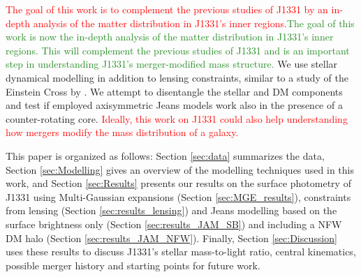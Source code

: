 \documentclass[useAMS,usenatbib]{mnras}
\newcommand{\NEW}[1]{\textcolor{ForestGreen}{#1}}
\newcommand{\OLD}[1]{\textcolor{Red}{#1}}
\begin{document}
\OLD{The goal of this work is to complement the previous studies of J1331 by an in-depth analysis of the matter distribution in J1331's inner regions.}\NEW{The goal of this work is now the in-depth analysis of the matter distribution in J1331's inner regions. This will complement the previous studies of J1331 and is an important step in understanding J1331's merger-modified mass structure.} We use stellar dynamical modelling in addition to lensing constraints, similar to a study of the Einstein Cross by \citet{GlennEC}. We attempt to disentangle the stellar and DM components and test if employed axisymmetric Jeans models work also in the presence of a counter-rotating core. \OLD{Ideally, this work on J1331 could also help understanding how mergers modify the mass distribution of a galaxy.}

This paper is organized as follows: Section \ref{sec:data} summarizes the data, Section \ref{sec:Modelling} gives an overview of the modelling techniques used in this work, and Section \ref{sec:Results} presents our results on the surface photometry of J1331 using Multi-Gaussian expansions (Section \ref{sec:MGE_results}), constraints from lensing (Section \ref{sec:results_lensing}) and Jeans modelling based on the surface brightness only (Section \ref{sec:results_JAM_SB}) and including a NFW DM halo (Section \ref{sec:results_JAM_NFW}). Finally, Section \ref{sec:Discussion} uses these results to discuss J1331's stellar mass-to-light ratio, central kinematics, possible merger history and starting points for future work.
\end{document}
